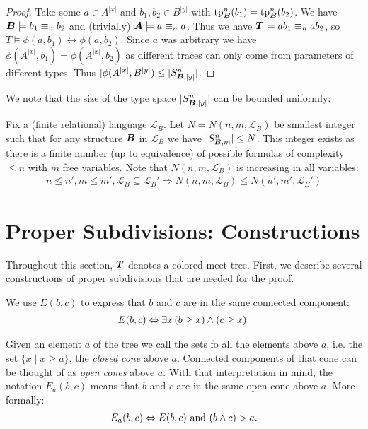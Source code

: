 \documentclass{amsart}
\DeclareMathOperator{\TT}{\boldface T}
\DeclareMathOperator{\A}{\boldface A}
\DeclareMathOperator{\B}{\boldface B}
\renewcommand{\LL}{\mathcal L}
\begin{document}
\begin{proof}
	Take some $a \in A^{|x|}$ and $b_1, b_2 \in B^{|y|}$ with $\tp^n_{\B}(b_1) = \tp^n_{\B}(b_2)$. We have $\B \models b_1 \equiv_n b_2$ and (trivially) $\A \models a \equiv_n a$. Thus  we have $\TT \models ab_1 \equiv_n ab_2$, so $T \models \phi(a, b_1) \leftrightarrow \phi(a, b_2)$. Since $a$ was arbitrary we have $\phi(A^{|x|}, b_1) = \phi(A^{|x|}, b_2)$ as different traces can only come from parameters of different types. Thus $|\phi(A^{|x|}, B^{|y|}) \leq |S^n_{\B, |y|}|$.
\end{proof}

We note that the size of the type space $|S^n_{\B, |y|}|$ can be bounded uniformly:

\begin{Definition} \label{def_type_count}
  Fix a (finite relational) language $\LL_B$. Let $N = N(n, m, \LL_B)$ be smallest integer such that for any structure $\B$ in $\LL_B$ we have $|S^n_{\B, m}| \leq N$. This integer exists as there is a finite number (up to equivalence) of possible formulas of complexity $\leq n$ with $m$ free variables.
  Note that $N(n, m, \LL_B)$ is increasing in all variables:
  \begin{align*}
    n \leq n', m \leq m', \LL_B \subseteq \LL_B' \Rightarrow N(n, m, \LL_B) \leq N(n', m', \LL_B')
  \end{align*}
\end{Definition}

\section{Proper Subdivisions: Constructions}

Throughout this section, $\TT$ denotes a colored meet tree.
First, we describe several constructions of proper subdivisions that are needed for the proof. 

\begin{Definition}
  We use $E(b,c)$ to express that $b$ and $c$ are in the same connected component:
  \begin{align*}
    E(b, c) \Leftrightarrow \exists x \, (b \geq x) \wedge (c \geq x).
  \end{align*}
\end{Definition}
\begin{Definition}
  Given an element $a$ of the tree we call the sets fo all the elements above $a$, i.e. the set $\{x \mid x \geq a\}$,
  the \emph{closed cone} above $a$.
  Connected components of that cone can be thought of as \emph{open cones} above $a$.
  With that interpretation in mind, the notation $E_a(b, c)$ means that $b$ and $c$ are in the same open cone above $a$. More formally:
	\begin{align*}
		E_a(b, c) \Leftrightarrow E(b,c) \text{ and } (b \wedge c) > a.
	\end{align*}
\end{Definition}
\end{document}

